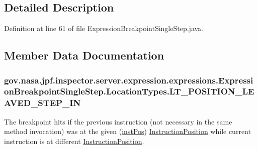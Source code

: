 \subsection{Detailed Description}


Definition at line 61 of file Expression\+Breakpoint\+Single\+Step.\+java.



\subsection{Member Data Documentation}
\subsubsection[{\texorpdfstring{L\+T\+\_\+\+P\+O\+S\+I\+T\+I\+O\+N\+\_\+\+L\+E\+A\+V\+E\+D\+\_\+\+S\+T\+E\+P\+\_\+\+IN}{LT_POSITION_LEAVED_STEP_IN}}]{\setlength{\rightskip}{0pt plus 5cm}gov.\+nasa.\+jpf.\+inspector.\+server.\+expression.\+expressions.\+Expression\+Breakpoint\+Single\+Step.\+Location\+Types.\+L\+T\+\_\+\+P\+O\+S\+I\+T\+I\+O\+N\+\_\+\+L\+E\+A\+V\+E\+D\+\_\+\+S\+T\+E\+P\+\_\+\+IN}\hypertarget{enumgov_1_1nasa_1_1jpf_1_1inspector_1_1server_1_1expression_1_1expressions_1_1_expression_breakp227857a8c42509ddd72c386e68619da4_a6bd7cb0e72926134198a7eb26ae84c46}{}\label{enumgov_1_1nasa_1_1jpf_1_1inspector_1_1server_1_1expression_1_1expressions_1_1_expression_breakp227857a8c42509ddd72c386e68619da4_a6bd7cb0e72926134198a7eb26ae84c46}


The breakpoint hits if the previous instruction (not necessary in the same method invocation) was at the given (\hyperlink{classgov_1_1nasa_1_1jpf_1_1inspector_1_1server_1_1expression_1_1expressions_1_1_expression_breakpoint_single_step_a72c10f41814ab478d923986e7c06b0da}{inst\+Pos}) \hyperlink{}{Instruction\+Position} while current instruction is at different \hyperlink{}{Instruction\+Position}. 



